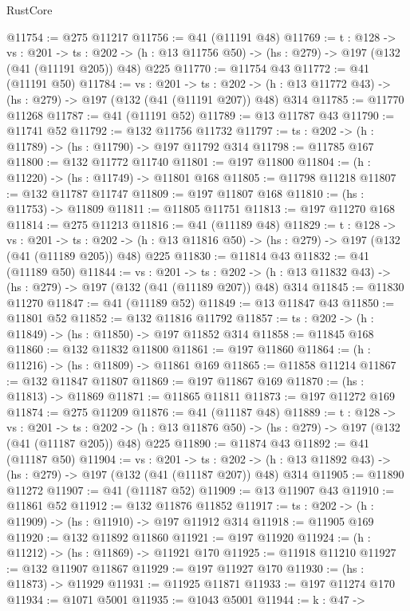 \begin{lexlean}{RustCore}
\begin{coremodule}
@11754 := @275 @11217
@11756 := @41 (@11191 @48)
@11769 := {t : @128} ->
  {vs : @201} ->
  {ts : @202} -> (h : @13 @11756 @50) -> (hs : @279) -> @197 (@132 (@41 (@11191 @205)) @48) @225
@11770 := @11754 @43
@11772 := @41 (@11191 @50)
@11784 := {vs : @201} ->
  {ts : @202} -> (h : @13 @11772 @43) -> (hs : @279) -> @197 (@132 (@41 (@11191 @207)) @48) @314
@11785 := @11770 @11268
@11787 := @41 (@11191 @52)
@11789 := @13 @11787 @43
@11790 := @11741 @52
@11792 := @132 @11756 @11732
@11797 := {ts : @202} -> (h : @11789) -> (hs : @11790) -> @197 @11792 @314
@11798 := @11785 @167
@11800 := @132 @11772 @11740
@11801 := @197 @11800
@11804 := (h : @11220) -> (hs : @11749) -> @11801 @168
@11805 := @11798 @11218
@11807 := @132 @11787 @11747
@11809 := @197 @11807 @168
@11810 := (hs : @11753) -> @11809
@11811 := @11805 @11751
@11813 := @197 @11270 @168
@11814 := @275 @11213
@11816 := @41 (@11189 @48)
@11829 := {t : @128} ->
  {vs : @201} ->
  {ts : @202} -> (h : @13 @11816 @50) -> (hs : @279) -> @197 (@132 (@41 (@11189 @205)) @48) @225
@11830 := @11814 @43
@11832 := @41 (@11189 @50)
@11844 := {vs : @201} ->
  {ts : @202} -> (h : @13 @11832 @43) -> (hs : @279) -> @197 (@132 (@41 (@11189 @207)) @48) @314
@11845 := @11830 @11270
@11847 := @41 (@11189 @52)
@11849 := @13 @11847 @43
@11850 := @11801 @52
@11852 := @132 @11816 @11792
@11857 := {ts : @202} -> (h : @11849) -> (hs : @11850) -> @197 @11852 @314
@11858 := @11845 @168
@11860 := @132 @11832 @11800
@11861 := @197 @11860
@11864 := (h : @11216) -> (hs : @11809) -> @11861 @169
@11865 := @11858 @11214
@11867 := @132 @11847 @11807
@11869 := @197 @11867 @169
@11870 := (hs : @11813) -> @11869
@11871 := @11865 @11811
@11873 := @197 @11272 @169
@11874 := @275 @11209
@11876 := @41 (@11187 @48)
@11889 := {t : @128} ->
  {vs : @201} ->
  {ts : @202} -> (h : @13 @11876 @50) -> (hs : @279) -> @197 (@132 (@41 (@11187 @205)) @48) @225
@11890 := @11874 @43
@11892 := @41 (@11187 @50)
@11904 := {vs : @201} ->
  {ts : @202} -> (h : @13 @11892 @43) -> (hs : @279) -> @197 (@132 (@41 (@11187 @207)) @48) @314
@11905 := @11890 @11272
@11907 := @41 (@11187 @52)
@11909 := @13 @11907 @43
@11910 := @11861 @52
@11912 := @132 @11876 @11852
@11917 := {ts : @202} -> (h : @11909) -> (hs : @11910) -> @197 @11912 @314
@11918 := @11905 @169
@11920 := @132 @11892 @11860
@11921 := @197 @11920
@11924 := (h : @11212) -> (hs : @11869) -> @11921 @170
@11925 := @11918 @11210
@11927 := @132 @11907 @11867
@11929 := @197 @11927 @170
@11930 := (hs : @11873) -> @11929
@11931 := @11925 @11871
@11933 := @197 @11274 @170
@11934 := @1071 @5001
@11935 := @1043 @5001
@11944 := {k : @47} ->

\end{coremodule}
\end{lexlean}
